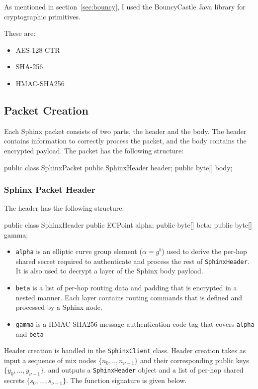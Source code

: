 \documentclass[final,dissertation.tex]{subfiles}
\begin{document}
As mentioned in section~\ref{sec:bouncy}, I used the BouncyCastle Java library for cryptographic primitives. 

These are: 
\begin{itemize}
\item AES-128-CTR
\item SHA-256
\item HMAC-SHA256
\end{itemize}

\subsection{Packet Creation}

Each Sphinx packet consists of two parts, the header and the body. The header contains information to correctly process the packet, and the body contains the encrypted payload. The packet has the following structure:

\begin{javacode}
public class SphinxPacket {
	public SphinxHeader header;
	public byte[] body;
}
\end{javacode}
	
\subsubsection{Sphinx Packet Header}

The header has the following structure:

\begin{javacode}
public class SphinxHeader {
	public ECPoint alpha;
	public byte[] beta;
	public byte[] gamma;
}
\end{javacode}

\begin{itemize}
	\item \verb|alpha| is an elliptic curve group element ($\alpha = g^b$) used to derive the per-hop shared secret required to authenticate and process the rest of \verb|SphinxHeader|. It is also used to decrypt a layer of the Sphinx body payload.
	\item \verb|beta| is a list of per-hop routing data and padding that is encrypted in a nested manner. Each layer contains routing commands that is defined and processed by a Sphinx node.
	\item \verb|gamma| is a HMAC-SHA256 message authentication code tag that covers \verb|alpha| and \verb|beta|
\end{itemize}

Header creation is handled in the \verb|SphinxClient| class. Header creation takes as input a sequence of mix nodes $\{n_0,..,n_{\nu-1}\}$ and their corresponding public keys $\{y_0,...,y_{\nu-1}\}$, and outputs a \verb|SphinxHeader| object and a list of per-hop shared secrets $\{s_0,...,s_{\nu-1}\}$. The function signature is given below.
\end{document}
